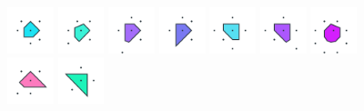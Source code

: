 \documentclass[text.tex]{subfiles}
\begin{document}
\begin{figure}[h!]
\includegraphics[width=0.12\textwidth]{img/results/octagon/octagon_112132_(-5_3alpha_2)_005.pdf}
\includegraphics[width=0.12\textwidth]{img/results/octagon/octagon_112132_(-5_3alpha_2)_006.pdf}
\includegraphics[width=0.12\textwidth]{img/results/octagon/octagon_112132_(-5_3alpha_2)_007.pdf}
\includegraphics[width=0.12\textwidth]{img/results/octagon/octagon_112132_(-5_3alpha_2)_008.pdf}
\includegraphics[width=0.12\textwidth]{img/results/octagon/octagon_112132_(-5_3alpha_2)_009.pdf}
\includegraphics[width=0.12\textwidth]{img/results/octagon/octagon_112132_(-5_3alpha_2)_010.pdf}
\includegraphics[width=0.12\textwidth]{img/results/octagon/octagon_112132_(-5_3alpha_2)_011.pdf}
\includegraphics[width=0.12\textwidth]{img/results/octagon/octagon_112132_(-5_3alpha_2)_012.pdf}
\includegraphics[width=0.12\textwidth]{img/results/octagon/octagon_112132_(-5_3alpha_2)_013.pdf}
\end{figure}
\end{document}
